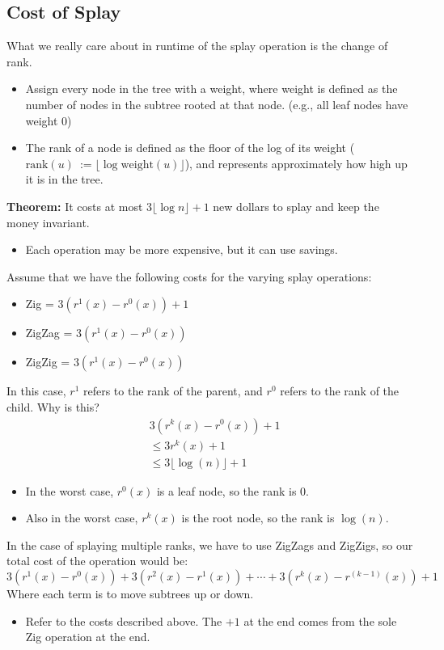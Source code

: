 \documentclass[10pt]{article}
\begin{document}
\subsection*{Cost of Splay}
What we really care about in runtime of the splay operation is the change of rank.
\begin{itemize}
    \item Assign every node in the tree with a weight, where weight is defined as the number of nodes in the subtree rooted at that node.  (e.g., all leaf nodes have weight 0)
    \item The rank of a node is defined as the floor of the log of its weight ($\text{rank}(u) \::= \lfloor \log \text{weight}(u) \rfloor$), and represents approximately how high up it is in the tree.
\end{itemize}

\textbf{Theorem:} It costs at most $3 \lfloor \log n \rfloor + 1$ new dollars to splay and keep the money invariant.
\begin{itemize}
	\item Each operation may be more expensive, but it can use savings.
\end{itemize}
Assume that we have the following costs for the varying splay operations:
\begin{itemize}
	\item Zig = $3(r^1(x) - r^0(x)) + 1$
	\item ZigZag = $3(r^1(x) - r^0(x))$
	\item ZigZig = $3(r^1(x) - r^0(x))$
\end{itemize}
In this case, $r^1$ refers to the rank of the parent, and $r^0$ refers to the rank of the child.  Why is this?
\begin{align*}
    &3(r^k(x) - r^0(x)) + 1 \\ 
    &\leq 3 r^k(x) + 1 \\
    &\leq 3 \lfloor \log(n) \rfloor + 1
\end{align*}
\begin{itemize}
	\item In the worst case, $r^0(x)$ is a leaf node, so the rank is 0.
	\item Also in the worst case, $r^k(x)$ is the root node, so the rank is $\log(n)$.
\end{itemize}
In the case of splaying multiple ranks, we have to use ZigZags and ZigZigs, so our total cost of the operation would be:
\[3(r^1(x) - r^0(x)) + 3(r^2(x) - r^1(x)) + \cdots + 3(r^k(x) - r^{(k - 1)}(x)) + 1\]
Where each term is to move subtrees up or down.
\begin{itemize}
	\item Refer to the costs described above.  The $+1$ at the end comes from the sole Zig operation at the end.
\end{itemize}
\end{document}

